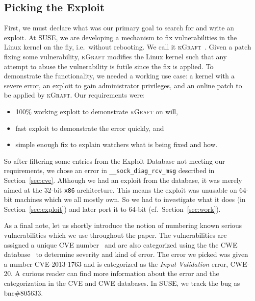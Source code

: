 \documentclass[10pt]{llncs}
\newcommand{\code}[2][]{\lstinline[columns=fullflexible, #1]$#2$}
\newcommand\kgr{\textsc{kGraft}\xspace}
\begin{document}
\subsection{Picking the Exploit}
First, we must declare what was our primary goal to search for and write an
exploit. At SUSE, we are developing a mechanism to fix vulnerabilities in the
Linux kernel on the fly, i.e.\ without rebooting. We call it \kgr~\cite{kgr}.
Given a patch fixing some vulnerability, \kgr modifies the Linux kernel such
that any attempt to abuse the vulnerability is futile since the fix is
applied. To demonstrate the functionality, we needed a working use case: a
kernel with a severe error, an exploit to gain administrator privileges, and
an online patch to be applied by \kgr. Our requirements were:
\begin{itemize}
  \item 100\% working exploit to demonstrate \kgr on will,
  \item fast exploit to demonstrate the error quickly, and
  \item simple enough fix to explain watchers what is being fixed and how.
\end{itemize}

So after filtering some entries from the Exploit Database not meeting our
requirements, we chose an error in \code{__sock_diag_rcv_msg} described in
Section~\ref{sec:cve}.  Although we had an exploit from the database, it was
merely aimed at the 32-bit \texttt{x86} architecture. This means the exploit
was unusable on 64-bit machines which we all mostly own.  So we had to
investigate what it does (in Section~\ref{sec:exploit}) and later port it to
64-bit (cf.\ Section~\ref{sec:work}).

As a final note, let us shortly introduce the notion of numbering known
serious vulnerabilities which we use throughout the paper. The vulnerabilities
are assigned a unique CVE number~\cite{cve} and are also categorized using the
the CWE database~\cite{cwe} to determine severity and kind of error.  The
error we picked was given a number CVE-2013-1763 and is categorized as the
\emph{Input Validation} error, CWE-20. A curious reader can find more
information about the error and the categorization in the CVE and CWE
databases. In SUSE, we track the bug as bnc\#805633.
\end{document}
